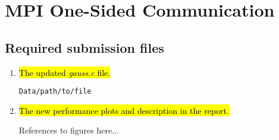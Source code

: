 \section{MPI One-Sided Communication}
\subsection{Required submission files}
\begin{enumerate}
  \item \hl{The updated \emph{gauss.c} file.}

    \verb!Data/path/to/file!

  \item \hl{The new performance plots and description in the report.}

    References to figures here...

\end{enumerate}

